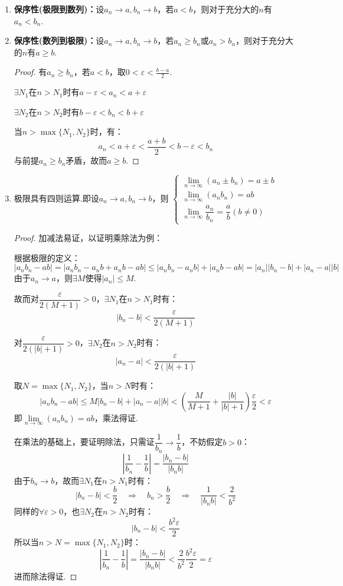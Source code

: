 \begin{enumerate}[property]
    \item \textbf{保序性(极限到数列)：}设$a_n \to a, b_n \to b$，若$a < b$，则对于充分大的$n$有$a_n < b_n$.

    \item \textbf{保序性(数列到极限)：}设$a_n \to a, b_n \to b$，若$a_n \geqslant b_n$或$a_n > b_n$，则对于充分大的$n$有$a \geqslant b$.
    \begin{proof}
        有$a_n \geqslant b_n$，若$a < b$，取$0 < \varepsilon < \frac{b-a}{2}$.

        $\exists N_1$在$n>N_1$时有$a-\varepsilon < a_n < a+\varepsilon$

        $\exists N_2$在$n>N_2$时有$b-\varepsilon < b_n < b+\varepsilon$

        当$n>\max\{N_1, N_2\}$时，有：
        \[a_n < a+\varepsilon < \frac{a+b}{2} < b-\varepsilon < b_n\]
        与前提$a_n \geqslant b_n$矛盾，故而$a \geqslant b$.
    \end{proof}

    \item 极限具有四则运算.即设$a_n \to a, b_n \to b$，则
    $\begin{cases}
        \lim\limits_{n \to \infty}(a_n \pm b_n) = a \pm b \\
        \lim\limits_{n \to \infty}(a_n b_n) = ab \\
        \lim\limits_{n \to \infty}\dfrac{a_n}{b_n} = \dfrac{a}{b}(b \neq 0)
    \end{cases}$
    \begin{proof}
        加减法易证，以证明乘除法为例：

        根据极限的定义：
        \[|a_n b_n - ab| = |a_n b_n - a_n b + a_n b - ab| \leqslant |a_n b_n - a_n b| + |a_n b - ab| = |a_n||b_n-b|+|a_n - a||b|\]
        由于$a_n \to a$，则$\exists M$使得$|a_n|\leqslant M$.
        
        故而对$\dfrac{\varepsilon}{2(M+1)}>0$，$\exists N_1$在$n>N_1$时有：
        \[|b_n-b|<\frac{\varepsilon}{2(M+1)}\]

        对$\dfrac{\varepsilon}{2(|b|+1)}>0$，$\exists N_2$在$n>N_2$时有：
        \[|a_n-a|<\frac{\varepsilon}{2(|b|+1)}\]

        取$N = \max\{N_1, N_2\}$，当$n>N$时有：
        \[|a_n b_n - ab| \leqslant M|b_n-b| + |a_n-a||b| < \left(\frac{M}{M+1} + \frac{|b|}{|b|+1}\right)\frac{\varepsilon}{2} < \varepsilon\]
        即$\lim\limits_{n \to \infty}(a_n b_n) = ab$，乘法得证.

        在乘法的基础上，要证明除法，只需证$\dfrac{1}{b_n}\to\dfrac{1}{b}$，不妨假定$b>0$：
        \[\left|\frac{1}{b_n} - \frac{1}{b}\right| = \frac{|b_n-b|}{|b_n b|}\]
        由于$b_n \to b$，故而$\exists N_1$在$n>N_1$时有：
        \[|b_n - b|<\frac{b}{2} \quad\Rightarrow\quad b_n>\frac{b}{2} \quad\Rightarrow\quad \frac{1}{|b_n b|}<\frac{2}{b^2}\]
        同样的$\forall \varepsilon > 0$，也$\exists N_2$在$n>N_2$时有：
        \[|b_n - b|<\frac{b^2 \varepsilon}{2}\]
        所以当$n > N = \max\{N_1, N_2\}$时：
        \[\left|\frac{1}{b_n} - \frac{1}{b}\right| = \frac{|b_n-b|}{|b_n b|} < \frac{2}{b^2}\frac{b^2 \varepsilon}{2} = \varepsilon\]
        进而除法得证.
    \end{proof}


\end{enumerate}
